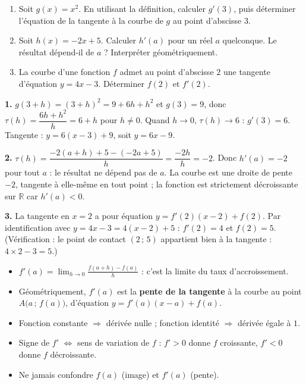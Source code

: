 \documentclass[11pt]{article}
\begin{document}
\begin{exercice}
\begin{enumerate}
\item Soit $g(x)=x^2$. En utilisant la définition, calculer $g'(3)$, puis déterminer l'équation de la tangente à la courbe de $g$ au point d'abscisse $3$.
\item Soit $h(x)=-2x+5$. Calculer $h'(a)$ pour un réel $a$ quelconque. Le résultat dépend-il de $a$ ? Interpréter géométriquement.
\item La courbe d'une fonction $f$ admet au point d'abscisse $2$ une tangente d'équation $y=4x-3$. Déterminer $f(2)$ et $f'(2)$.
\end{enumerate}
\end{exercice}

\begin{corrige}[Exercice 1]
\textbf{1.} $g(3+h)=(3+h)^2=9+6h+h^2$ et $g(3)=9$, donc $\tau(h)=\dfrac{6h+h^2}{h}=6+h$ pour $h\neq 0$. Quand $h\to 0$, $\tau(h)\to 6$ : $g'(3)=6$. Tangente : $y=6(x-3)+9$, soit $y=6x-9$.

\textbf{2.} $\tau(h)=\dfrac{-2(a+h)+5-(-2a+5)}{h}=\dfrac{-2h}{h}=-2$. Donc $h'(a)=-2$ pour tout $a$ : le résultat ne dépend pas de $a$. La courbe est une droite de pente $-2$, tangente à elle-même en tout point ; la fonction est strictement décroissante sur $\mathbb{R}$ car $h'(a)<0$.

\textbf{3.} La tangente en $x=2$ a pour équation $y=f'(2)(x-2)+f(2)$. Par identification avec $y=4x-3=4(x-2)+5$ : $f'(2)=4$ et $f(2)=5$. (Vérification : le point de contact $(2\,;\,5)$ appartient bien à la tangente : $4\times 2-3=5$.)
\end{corrige}

\begin{aretenir}
\begin{itemize}
\item $f'(a)=\displaystyle\lim_{h\to 0}\frac{f(a+h)-f(a)}{h}$ : c'est la limite du taux d'accroissement.
\item Géométriquement, $f'(a)$ est la \textbf{pente de la tangente} à la courbe au point $A\big(a\,;\,f(a)\big)$, d'équation $y=f'(a)(x-a)+f(a)$.
\item Fonction constante $\Rightarrow$ dérivée nulle ; fonction identité $\Rightarrow$ dérivée égale à $1$.
\item Signe de $f'$ $\Longleftrightarrow$ sens de variation de $f$ : $f'>0$ donne $f$ croissante, $f'<0$ donne $f$ décroissante.
\item Ne jamais confondre $f(a)$ (image) et $f'(a)$ (pente).
\end{itemize}
\end{aretenir}
\end{document}
